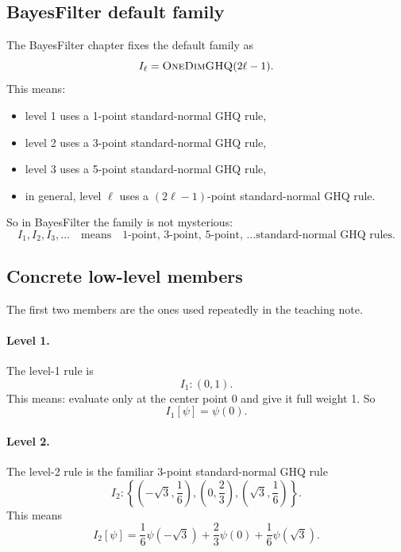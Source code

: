 \documentclass[11pt]{article}
\begin{document}
\subsection{BayesFilter default family}

The BayesFilter chapter fixes the default family as
\begin{equation}
  I_\ell = \textsc{OneDimGHQ}(2\ell-1).
  \label{eq:ghq-family-policy}
\end{equation}
This means:
\begin{itemize}[leftmargin=0.28in]
  \item level 1 uses a 1-point standard-normal GHQ rule,
  \item level 2 uses a 3-point standard-normal GHQ rule,
  \item level 3 uses a 5-point standard-normal GHQ rule,
  \item in general, level \(\ell\) uses a \((2\ell-1)\)-point standard-normal GHQ
  rule.
\end{itemize}

So in BayesFilter the family is not mysterious:
\begin{equation}
  I_1, I_2, I_3, \ldots
  \quad\text{means}\quad
  \text{1-point, 3-point, 5-point, \ldots standard-normal GHQ rules.}
  \label{eq:ghq-family-plain-english}
\end{equation}

\subsection{Concrete low-level members}

The first two members are the ones used repeatedly in the teaching note.

\paragraph{Level 1.}
The level-1 rule is
\begin{equation}
  I_1:(0,1).
  \label{eq:I1-definition}
\end{equation}
This means: evaluate only at the center point 0 and give it full weight 1.  So
\begin{equation}
  I_1[\psi]=\psi(0).
  \label{eq:I1-action}
\end{equation}

\paragraph{Level 2.}
The level-2 rule is the familiar 3-point standard-normal GHQ rule
\begin{equation}
  I_2:
  \left\{\left(-\sqrt3,\frac16\right),\left(0,\frac23\right),
  \left(\sqrt3,\frac16\right)\right\}.
  \label{eq:I2-definition}
\end{equation}
This means
\begin{equation}
  I_2[\psi]
  =
  \frac16\psi(-\sqrt3)+\frac23\psi(0)+\frac16\psi(\sqrt3).
  \label{eq:I2-action}
\end{equation}
\end{document}
